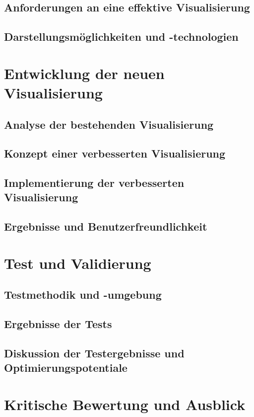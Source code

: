 \documentclass[a4paper, 12pt]{article} %
\begin{document}
\subsection{Anforderungen an eine effektive Visualisierung}
\subsection{Darstellungsmöglichkeiten und -technologien}

\section{Entwicklung der neuen Visualisierung}
\subsection{Analyse der bestehenden Visualisierung}
\subsection{Konzept einer verbesserten Visualisierung}
\subsection{Implementierung der verbesserten Visualisierung}
\subsection{Ergebnisse und Benutzerfreundlichkeit}

\section{Test und Validierung}
\subsection{Testmethodik und -umgebung}
\subsection{Ergebnisse der Tests}
\subsection{Diskussion der Testergebnisse und Optimierungspotentiale}

\section{Kritische Bewertung und Ausblick}
\end{document}
